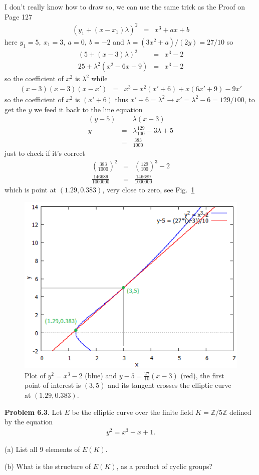 \documentclass[aps,preprint,preprintnumbers,nofootinbib,showpacs,prd]{revtex4-1}
\newcommand{\nbea}{\begin{eqnarray*}}
\newcommand{\neea}{\end{eqnarray*}}
\begin{document}
I don't really know how to draw so, we can use the same trick as the Proof on Page 127
%
\nbea
(y_1 + (x - x_1)\lambda)^2 & = & x^3 + ax + b
\neea
%
here $y_1 = 5,~x_1 = 3,~ a = 0,~ b = -2$ and $\lambda = (3x^2 + a) / (2y) = 27/10$ so
%
\nbea
(5 + (x - 3)\lambda)^2 & = & x^3 - 2 \\
25 + \lambda^2(x^2 - 6x + 9) & = & x^3 - 2
\neea
%
so the coefficient of $x^2$ is $\lambda^2$ while
%
\nbea
(x - 3)(x - 3)(x - x') & = & x^3 - x^2(x'+6) + x(6x' + 9) - 9x'
\neea
%
so the coefficient of $x^2$ is $(x' + 6)$ thus $x' + 6 = \lambda^2 \to x' = \lambda^2 - 6 = 129/100$, to get the $y$ we feed it back to the line equation
%
\nbea
(y - 5) & = & \lambda(x - 3) \\
y & = & \lambda\frac{129}{100} - 3\lambda + 5 \\
& = & \frac{383}{1000}
\neea
%
just to check if it's correct
%
\nbea
\left ( \frac{383}{1000} \right )^2 & = & \left ( \frac{129}{100}\right )^3 - 2 \\
\frac{146689}{1000000} & = & \frac{146689}{1000000}
\neea
%
which is point at $(1.29, 0.383)$, very close to zero, see Fig.~\ref{fig:Problem-6.2}
%
\begin{figure}
\centering
  \includegraphics[width=.65\linewidth]{Problem_6_2.png}
  \caption{Plot of $y^2 = x^3-2$ (blue) and $y - 5 = \frac{27}{10}(x-3)$ (red), the first point of interest is $(3,5)$ and its tangent crosses the elliptic curve at $(1.29, 0.383)$.}
\label{fig:Problem-6.2}
\end{figure}
%

{\bf Problem 6.3}. Let $E$ be the elliptic curve over the ﬁnite ﬁeld $K = \mathbb{Z}/5\mathbb{Z}$ deﬁned by the equation
%
\nbea
y^2 = x^3 + x + 1.
\neea
%

(a) List all 9 elements of $E(K)$.

(b) What is the structure of $E(K)$, as a product of cyclic groups?
\end{document}
